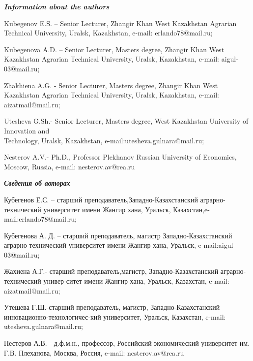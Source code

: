\emph{{\bfseries Information about the authors}}
\begin{noparindent}

Kubegenov E.S. -- Senior Lecturer, Zhangir Khan West Kazakhstan Agrarian
Technical University, Uralsk, Kazakhstan, e-mail: erlando78@mail.ru;

Kubegenova A.D. -- Senior Lecturer, Master\textquotesingle s degree,
Zhangir Khan West Kazakhstan Agrarian Technical University, Uralsk,
Kazakhstan, e-mail: aigul-03@mail.ru;

Zhakhiena A.G. - Senior Lecturer, Master\textquotesingle s degree,
Zhangir Khan West Kazakhstan Agrarian Technical University, Uralsk,
Kazakhstan, e-mail: aizatmail@mail.ru;

Utesheva G.Sh.- Senior Lecturer, Master\textquotesingle s degree, West
Kazakhstan University of Innovation and \\Technology, Uralsk, Kazakhstan,
e-mail:utesheva.gulnara@mail.ru;

Nesterov A.V.- Ph.D., Professor Plekhanov Russian University of
Economics, Moscow, Russia, e-mail: nesterov.av@rea.ru
\end{noparindent}

\emph{{\bfseries Сведения об авторах}}
\begin{noparindent}

Кубегенов Е.С. -- старший преподаватель,Западно-Казахстанский
аграрно-технический университет имени Жангир хана, Уральск,
Казахстан,e-mail:erlando78@mail.ru;

Кубегенова А. Д. -- старший преподаватель, магистр Западно-Казахстанский
аграрно-технический университет имени Жангир хана, Уральск,
e-mail:aigul-03@mail.ru;

Жахиена А.Г.- старший преподаватель,магистр, Западно-Казахстанский
аграрно-технический универ-ситет имени Жангир хана, Уральск, Казахстан,
e-mail: aizatmail@mail.ru;

Утешева Г.Ш.-старший преподаватель, магистр, Западно-Казахстанский
инновационно-технологичес-кий университет, Уральск, Казахстан, e-mail:
utesheva.gulnara@mail.ru;

Нестеров А.В. - д.ф.м.н., профессор, Российский экономический
университет им. Г.В. Плеханова, Москва, Россия, e-mail:
nesterov.av@rea.ru

\end{noparindent}
